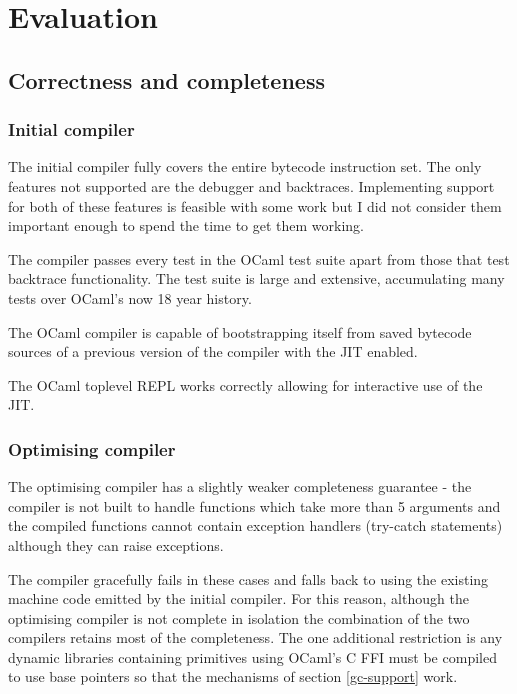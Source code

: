 \chapter{Evaluation}

\section{Correctness and completeness}

\subsection{Initial compiler}

The initial compiler fully covers the entire bytecode instruction set. The only features not
supported are
the debugger and backtraces. Implementing support for both of these features is feasible with some
work but
I did not consider them important enough to spend the time to get them working.

The compiler passes every test in the OCaml test suite apart from those that test backtrace
functionality. The test suite is large and extensive, accumulating many tests over OCaml's now
18 year history.

The OCaml compiler is capable of bootstrapping itself from saved bytecode sources
of a previous version of the compiler with the JIT enabled.

The OCaml toplevel REPL works correctly allowing for interactive use of the JIT.

\subsection{Optimising compiler}

The optimising compiler has a slightly weaker completeness guarantee - the compiler is not built to
handle functions which take more than 5 arguments and the compiled functions cannot contain
exception
handlers (try-catch statements) although they can raise exceptions.

The compiler gracefully fails in these cases and falls back to using the existing machine code
emitted
by the initial compiler. For this reason, although the optimising compiler is not complete in
isolation
the combination of the two compilers retains most of the completeness. The one additional
restriction
is any dynamic libraries containing primitives using OCaml's C FFI must be compiled to use base
pointers
so that the mechanisms of section \ref{gc-support} work.

